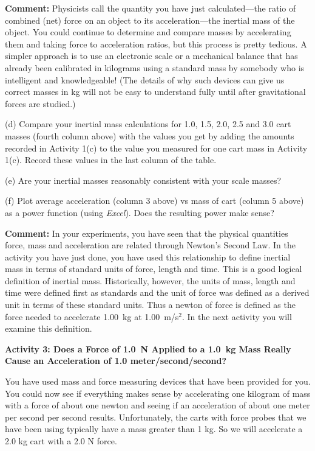 \textbf{Comment:} Physicists call the quantity you have just calculated---the
ratio of combined (net) force on an object to its acceleration---the inertial
mass of the object. You could continue to determine and compare masses by accelerating them and taking force to acceleration ratios, but this process is pretty tedious.
A simpler approach is to use an electronic scale or a mechanical balance that
has already been calibrated in kilograms using a standard mass by somebody who
is intelligent and knowledgeable! (The details of why such devices can give
us correct masses in kg will not be easy to understand fully until after gravitational forces are studied.) 

(d) Compare your inertial mass calculations for 1.0, 1.5, 2.0, 2.5 and 3.0 cart
masses (fourth column above) with the values you get by adding the amounts recorded in Activity 1(c) to the value you measured for one cart mass in Activity 1(c). Record these values in the last column of the table.

(e) Are your inertial masses reasonably consistent with your scale masses?
\answerspace{10mm}

(f) Plot average acceleration (column 3 above) vs mass of cart (column 5 above) as a power function (using \textit{Excel}). Does the resulting power make sense?
\answerspace{5mm}

\textbf{Comment:} In your experiments, you have seen that the physical quantities
force, mass and acceleration are related through Newton's Second Law. In the
activity you have just done, you have used this relationship to define inertial
mass in terms of standard units of force, length and time. This is a good logical
definition of inertial mass. Historically, however, the units of mass, length
and time were defined first as standards and the unit of force was defined as
a derived unit in terms of these standard units. Thus a newton of force is defined
as the force needed to accelerate 1.00~kg at 1.00~m/s$^2$. In the next activity
you will examine this definition. 

\pagebreak[2]
\textbf{Activity 3: Does a Force of 1.0~N Applied to a 1.0~kg Mass Really Cause
an Acceleration of 1.0 meter/second/second?} 

You have used mass and force measuring devices that have been provided for you.
You could now see if everything makes sense by accelerating one kilogram of
mass with a force of about one newton and seeing if an acceleration of about
one meter per second per second results. Unfortunately, the carts with force
probes that we have been using typically have a mass greater than 1 kg. So we
will accelerate a 2.0 kg cart with a 2.0 N force.

